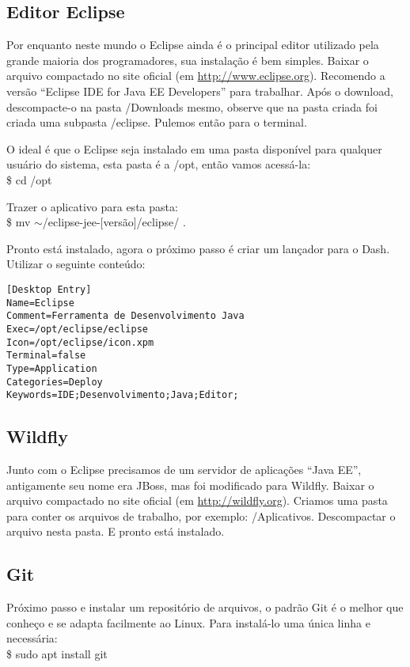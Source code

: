 \subsection{Editor Eclipse}
Por enquanto neste mundo o Eclipse ainda é o principal editor utilizado pela grande maioria dos programadores, sua instalação é bem simples. Baixar o arquivo compactado no site oficial (em \url{http://www.eclipse.org}). Recomendo a versão ``Eclipse IDE for Java EE Developers'' para trabalhar. Após o download, descompacte-o na pasta /Downloads mesmo, observe que na pasta criada foi criada uma subpasta /eclipse. Pulemos então para o terminal.

O ideal é que o Eclipse seja instalado em uma pasta disponível para qualquer usuário do sistema, esta pasta é a /opt, então vamos acessá-la: \\
{\ttfamily\$ cd /opt}

Trazer o aplicativo para esta pasta: \\
{\ttfamily\$ mv $\sim$/eclipse-jee-[versão]/eclipse/ .}

Pronto está instalado, agora o próximo passo é criar um lançador para o Dash. Utilizar o seguinte conteúdo:
\begin{lstlisting}
[Desktop Entry]
Name=Eclipse
Comment=Ferramenta de Desenvolvimento Java
Exec=/opt/eclipse/eclipse
Icon=/opt/eclipse/icon.xpm
Terminal=false
Type=Application
Categories=Deploy
Keywords=IDE;Desenvolvimento;Java;Editor;
\end{lstlisting}

\subsection{Wildfly}
Junto com o Eclipse precisamos de um servidor de aplicações ``Java EE'', antigamente seu nome era JBoss, mas foi modificado para Wildfly. Baixar o arquivo compactado no site oficial (em \url{http://wildfly.org}). Criamos uma pasta para conter os arquivos de trabalho, por exemplo: /Aplicativos. Descompactar o arquivo nesta pasta. E pronto está instalado.

\subsection{Git}
Próximo passo e instalar um repositório de arquivos, o padrão Git é o melhor que conheço e se adapta facilmente ao Linux. Para instalá-lo uma única linha e necessária: \\
{\ttfamily\$ sudo apt install git}

